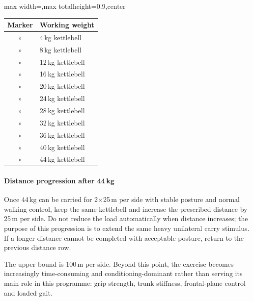 \documentclass[11pt,a4paper]{article}
\newcommand{\tablearraystretch}{1.15}
\begin{document}
\begin{center}
\renewcommand{\arraystretch}{\tablearraystretch}
\begin{adjustbox}{max width=\linewidth,max totalheight=0.9\textheight,center}
\begin{tabular}{cl}
\toprule
Marker & Working weight \\
\midrule
$\circ$ & 4\,kg kettlebell \\
$\circ$ & 8\,kg kettlebell \\
$\circ$ & 12\,kg kettlebell \\
$\circ$ & 16\,kg kettlebell \\
$\circ$ & 20\,kg kettlebell \\
$\circ$ & 24\,kg kettlebell \\
$\circ$ & 28\,kg kettlebell \\
$\circ$ & 32\,kg kettlebell \\
$\circ$ & 36\,kg kettlebell \\
$\circ$ & 40\,kg kettlebell \\
$\circ$ & 44\,kg kettlebell \\
\bottomrule
\end{tabular}
\end{adjustbox}
\renewcommand{\arraystretch}{1}
\end{center}

\paragraph{Distance progression after 44\,kg}

Once 44\,kg can be carried for 2$\times$25\,m per side with stable posture and normal walking control, keep the same kettlebell and increase the prescribed distance by 25\,m per side. Do not reduce the load automatically when distance increases; the purpose of this progression is to extend the same heavy unilateral carry stimulus. If a longer distance cannot be completed with acceptable posture, return to the previous distance row.

The upper bound is 100\,m per side. Beyond this point, the exercise becomes increasingly time-consuming and conditioning-dominant rather than serving its main role in this programme: grip strength, trunk stiffness, frontal-plane control and loaded gait.
\end{document}
